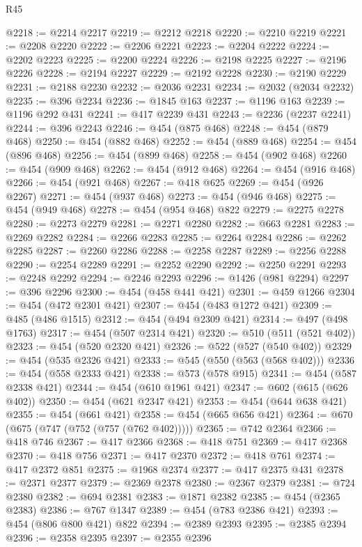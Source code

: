 \begin{lexlean}{R45}
\begin{coremodule}
{{{{{{{{{{{{{{{{{{{{{{{{{{{{{{{{{{{{{{{{{{{{{{{{{{{{{{{{{{{{{{{{{{{{{{{{{{{{{{{{{{{{{{{{{{{@2218 := @2214 @2217
@2219 := @2212 @2218
@2220 := @2210 @2219
@2221 := @2208 @2220
@2222 := @2206 @2221
@2223 := @2204 @2222
@2224 := @2202 @2223
@2225 := @2200 @2224
@2226 := @2198 @2225
@2227 := @2196 @2226
@2228 := @2194 @2227
@2229 := @2192 @2228
@2230 := @2190 @2229
@2231 := @2188 @2230
@2232 := @2036 @2231
@2234 := @2032 (@2034 @2232)
@2235 := @396 @2234
@2236 := @1845 @163
@2237 := @1196 @163
@2239 := @1196 @292 @431
@2241 := @417 @2239 @431
@2243 := @2236 (@2237 @2241)
@2244 := @396 @2243
@2246 := @454 (@875 @468)
@2248 := @454 (@879 @468)
@2250 := @454 (@882 @468)
@2252 := @454 (@889 @468)
@2254 := @454 (@896 @468)
@2256 := @454 (@899 @468)
@2258 := @454 (@902 @468)
@2260 := @454 (@909 @468)
@2262 := @454 (@912 @468)
@2264 := @454 (@916 @468)
@2266 := @454 (@921 @468)
@2267 := @418 @625
@2269 := @454 (@926 @2267)
@2271 := @454 (@937 @468)
@2273 := @454 (@946 @468)
@2275 := @454 (@949 @468)
@2278 := @454 (@954 @468) @822
@2279 := @2275 @2278
@2280 := @2273 @2279
@2281 := @2271 @2280
@2282 := @663 @2281
@2283 := @2269 @2282
@2284 := @2266 @2283
@2285 := @2264 @2284
@2286 := @2262 @2285
@2287 := @2260 @2286
@2288 := @2258 @2287
@2289 := @2256 @2288
@2290 := @2254 @2289
@2291 := @2252 @2290
@2292 := @2250 @2291
@2293 := @2248 @2292
@2294 := @2246 @2293
@2296 := @1426 (@981 @2294)
@2297 := @396 @2296
@2300 := @454 (@458 @441 @421)
@2301 := @459 @1266
@2304 := @454 (@472 @2301 @421)
@2307 := @454 (@483 @1272 @421)
@2309 := @485 (@486 @1515)
@2312 := @454 (@494 @2309 @421)
@2314 := @497 (@498 @1763)
@2317 := @454 (@507 @2314 @421)
@2320 := @510 (@511 (@521 @402))
@2323 := @454 (@520 @2320 @421)
@2326 := @522 (@527 (@540 @402))
@2329 := @454 (@535 @2326 @421)
@2333 := @545 (@550 (@563 (@568 @402)))
@2336 := @454 (@558 @2333 @421)
@2338 := @573 (@578 @915)
@2341 := @454 (@587 @2338 @421)
@2344 := @454 (@610 @1961 @421)
@2347 := @602 (@615 (@626 @402))
@2350 := @454 (@621 @2347 @421)
@2353 := @454 (@644 @638 @421)
@2355 := @454 (@661 @421)
@2358 := @454 (@665 @656 @421)
@2364 := @670 (@675 (@747 (@752 (@757 (@762 @402)))))
@2365 := @742 @2364
@2366 := @418 @746
@2367 := @417 @2366
@2368 := @418 @751
@2369 := @417 @2368
@2370 := @418 @756
@2371 := @417 @2370
@2372 := @418 @761
@2374 := @417 @2372 @851
@2375 := @1968 @2374
@2377 := @417 @2375 @431
@2378 := @2371 @2377
@2379 := @2369 @2378
@2380 := @2367 @2379
@2381 := @724 @2380
@2382 := @694 @2381
@2383 := @1871 @2382
@2385 := @454 (@2365 @2383)
@2386 := @767 @1347
@2389 := @454 (@783 @2386 @421)
@2393 := @454 (@806 @800 @421) @822
@2394 := @2389 @2393
@2395 := @2385 @2394
@2396 := @2358 @2395
@2397 := @2355 @2396
}}}}}}}}}}}}}}}}}}}}}}}}}}}}}}}}}}}}}}}}}}}}}}}}}}}}}}}}}}}}}}}}}}}}}}}}}}}}}}}}}}}}}}}}}}}
\end{coremodule}
\end{lexlean}
